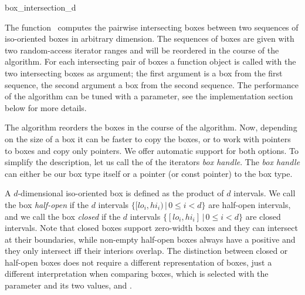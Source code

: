 

\begin{ccRefFunction}{box_intersection_d}

\ccDefinition

The function \ccRefName\ computes the pairwise intersecting boxes
between two sequences of iso-oriented boxes in arbitrary dimension.
The sequences of boxes are given with two random-access iterator
ranges and will be reordered in the course of the algorithm. For each
intersecting pair of boxes a  function object is called
with the two intersecting boxes as argument; the first argument is a
box from the first sequence, the second argument a box from the second
sequence.  The performance of the algorithm can be tuned with a
 parameter, see the implementation section below for more
details.

The algorithm reorders the boxes in the course of the algorithm. Now,
depending on the size of a box it can be faster to copy the boxes, or
to work with pointers to boxes and copy only pointers. We offer
automatic support for both options. To simplify the description, let
us call the  of the iterators \emph{box handle}.  The
\emph{box handle\/} can either be our box type itself or a pointer (or
const pointer) to the box type.

A $d$-dimensional iso-oriented box is defined as the
 product of $d$ intervals. We call the
box \emph{half-open} if the $d$ intervals $\{ [lo_i,hi_i) \,|\, 0 \leq
i < d\}$ are half-open intervals, and we call the box \emph{closed} if
the $d$ intervals $\{ [lo_i,hi_i] \,|\, 0 \leq i < d\}$ are closed
intervals. Note that closed boxes support zero-width boxes and they
can intersect at their boundaries, while non-empty half-open boxes
always have a positive  and they only intersect iff their
interiors overlap.  The distinction between closed or half-open boxes
does not require a different representation of boxes, just a different
interpretation when comparing boxes, which is selected with the
 parameter and its two values,
 and
.


\end{ccRefFunction}

